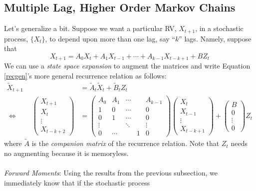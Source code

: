 \documentclass[a4paper,12pt]{scrartcl}
\begin{document}
\newpage
\subsection{Multiple Lag, Higher Order Markov Chains}

Let's generalize a bit.  Suppose we want a particular RV,
${X}_{t+1}$, in a stochastic process, $\{{X}_t\}$, to
depend upon more than one lag, say ``$k$'' lags. Namely, suppose that
\begin{equation}
    \label{recgen}
    {X}_{t+1} = A_0 {X}_t + A_1 {X}_{t-1}
    + \cdots + A_{k-1}{X}_{t-k+1} + B {Z}_t
\end{equation}
We can use a \emph{state space expansion} to augment the matrices 
and write Equation \ref{recgen}'s more general recurrence relation 
as follows:
\begin{align*}
    \tilde{{X}}_{t+1} &= \tilde{A}_t
	\tilde{{X}}_t + \tilde{B}_t {Z}_t \\
    \Leftrightarrow \qquad
    \begin{pmatrix} {X}_{t+1} \\
	{X}_{t} \\ \vdots \\ {X}_{t-k+2} \end{pmatrix}
	&= 
	\begin{pmatrix} A_0 & A_1 & \cdots & & A_{k-1} \\
			1 & 0 & \cdots & & 0 \\
			0 & 1 & \cdots & & 0 \\
			\vdots & & \ddots & & \vdots \\
			0 & \cdots & & 1 & 0 
	\end{pmatrix} 
	\begin{pmatrix} {X}_{t} \\
	{X}_{t-1} \\ \vdots \\ {X}_{t-k+1} \end{pmatrix}
	+ \begin{pmatrix} B \\ 0 \\ \vdots \\ 0 \end{pmatrix}
	{Z}_t
\end{align*}
where $\tilde{A}$ is the \emph{companion matrix} of the
recurrence relation.
Note that ${Z}_t$ needs no augmenting because it is memoryless.
\\
\\
{\sl Forward Moments}: Using the results from the previous 
subsection, we immediately know that if the stochastic process
\end{document}

